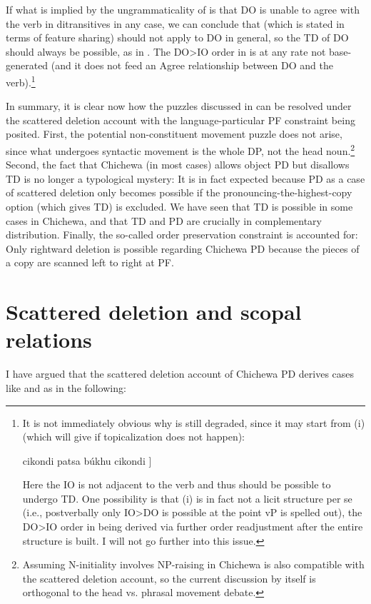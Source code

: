 \documentclass[output=paper,colorlinks,citecolor=brown
]{langscibook}
\begin{document}
 If what is implied by the ungrammaticality of  is that DO is unable to agree with the verb in ditransitives in any case, we can conclude that  (which is stated in terms of feature sharing) should not apply to DO in general, so the TD of DO should always be possible, as in . The DO>IO order in  is at any rate not base-generated (and it does not feed an Agree relationship between DO and the verb).\footnote{It is not immediately obvious why  is still degraded, since it may start from (i) (which will give  if topicalization does not happen):
\begin{exe}
   \label{ex:chen:IODOvP}   cikondi patsa b\'{u}khu cikondi ]
\end{exe}
Here the IO is not adjacent to the verb and thus should be possible to undergo TD. One possibility is that (i) is in fact not a licit structure per se (i.e., postverbally only IO>DO is possible at the point vP is spelled out), the DO>IO order in  being derived via further order readjustment after the entire structure is built. I will not go further into this issue.}

In summary, it is clear now how the puzzles discussed in  can be resolved under the scattered deletion account with the language-particular PF constraint  being posited. First, the potential non-constituent movement puzzle does not arise, since what undergoes syntactic movement is the whole DP, not the head noun.\footnote{Assuming N-initiality involves NP-raising in Chichewa is also compatible with the scattered deletion account, so the current discussion by itself is orthogonal to the head vs. phrasal movement debate.} Second, the fact that Chichewa (in most cases) allows object PD but disallows TD is no longer a typological mystery: It is in fact expected because PD as a case of scattered deletion only becomes possible if the pronouncing-the-highest-copy option (which gives TD) is excluded. We have seen that TD is possible in some cases in Chichewa, and that TD and PD are crucially in complementary distribution. Finally, the so-called order preservation constraint is accounted for: Only rightward deletion is possible regarding Chichewa PD because the pieces of a copy are scanned left to right at PF.

\section{Scattered deletion and scopal relations}\label{sec:chen:4}
I have argued that the scattered deletion account of Chichewa PD derives cases like  and  as in the following:
\end{document}
